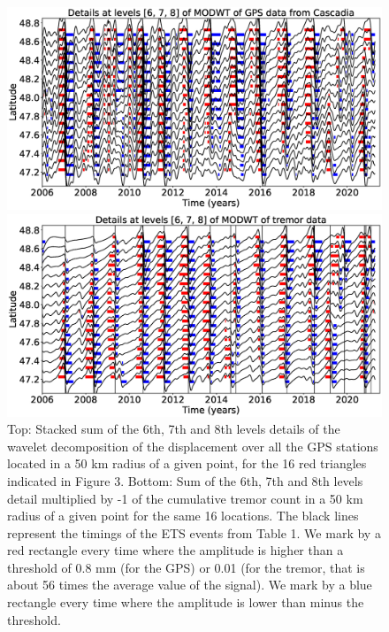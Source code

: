 \documentclass{article}
\begin{document}
\begin{figure}
\noindent\includegraphics[width=\textwidth, trim={0cm 0cm 0cm 0cm},clip]{figures/GPS_longer_details_6-7-8.eps}

\noindent\includegraphics[width=\textwidth, trim={0cm 0cm 0cm 0cm},clip]{figures/tremor_longer_detail_6-7-8.eps}
\caption{Top: Stacked sum of the 6th, 7th and 8th levels details of the wavelet decomposition of the displacement over all the GPS stations located in a 50 km radius of a given point, for the 16 red triangles indicated in Figure 3. Bottom: Sum of the 6th, 7th and 8th levels detail multiplied by -1 of the cumulative tremor count in a 50 km radius of a given point for the same 16 locations. The black lines represent the timings of the ETS events from Table 1. We mark by a red rectangle every time where the amplitude is higher than a threshold of 0.8 mm (for the GPS) or 0.01 (for the tremor, that is about 56 times the average value of the signal). We mark by a blue rectangle every time where the amplitude is lower than minus the threshold.}
\label{pngfiguresample}
\end{figure}
\end{document}
